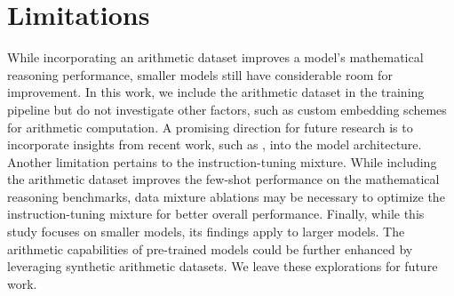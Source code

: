 \section{Limitations}
While incorporating an arithmetic dataset improves a model's mathematical reasoning performance, smaller models still have considerable room for improvement. In this work, we include the arithmetic dataset in the training pipeline but do not investigate other factors, such as custom embedding schemes for arithmetic computation. A promising direction for future research is to incorporate insights from recent work, such as \citet{mcleish2024transformers}, into the model architecture. Another limitation pertains to the instruction-tuning mixture. While including the arithmetic dataset improves the few-shot performance on the mathematical reasoning benchmarks, data mixture ablations may be necessary to optimize the instruction-tuning mixture for better overall performance. Finally, while this study focuses on smaller models, its findings apply to larger models. The arithmetic capabilities of pre-trained models could be further enhanced by leveraging synthetic arithmetic datasets. We leave these explorations for future work.
